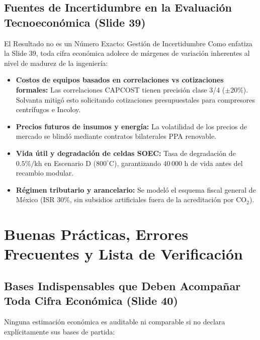 \documentclass[11pt,letterpaper]{article}
\begin{document}
\subsection{Fuentes de Incertidumbre en la Evaluación Tecnoeconómica (Slide 39)}
\begin{warningbox}{El Resultado no es un Número Exacto: Gestión de Incertidumbre}
Como enfatiza la Slide 39, toda cifra económica adolece de márgenes de variación inherentes al nivel de madurez de la ingeniería:
\begin{itemize}
    \item \textbf{Costos de equipos basados en correlaciones vs cotizaciones formales:} Las correlaciones CAPCOST tienen precisión clase 3/4 ($\pm 20\%$). Solvanta mitigó esto solicitando cotizaciones presupuestales para compresores centrífugos e Incoloy.
    \item \textbf{Precios futuros de insumos y energía:} La volatilidad de los precios de mercado se blindó mediante contratos bilaterales PPA renovable.
    \item \textbf{Vida útil y degradación de celdas SOEC:} Tasa de degradación de $0.5\%\text{/kh}$ en Escenario D ($800^\circ\text{C}$), garantizando $40\,000\text{ h}$ de vida antes del recambio modular.
    \item \textbf{Régimen tributario y arancelario:} Se modeló el esquema fiscal general de México (ISR 30\%, sin subsidios artificiales fuera de la acreditación por $\text{CO}_2$).
\end{itemize}
\end{warningbox}

\newpage

\section{Buenas Prácticas, Errores Frecuentes y Lista de Verificación}

\subsection{Bases Indispensables que Deben Acompañar Toda Cifra Económica (Slide 40)}
Ninguna estimación económica es auditable ni comparable si no declara explícitamente sus bases de partida:
\end{document}
